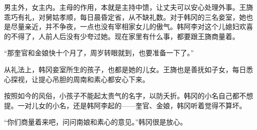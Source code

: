 男主外，女主内。主母的作用，本就是主持中馈，让丈夫可以安心处理外事。王旖乖巧有礼，对舅姑孝顺，每日晨昏定省，从不缺礼数。对于韩冈的三名妾室，她也是尽量亲近，并不争夜，一点也没有宰相家女儿的傲气。韩阿李对这个儿媳妇欢喜的不得了，人前人后没有少夸过她。现在家里有什么事，都要跟王旖商量着。

“那奎官和金娘快十个月了，周岁转眼就到，也要准备一下了。”

从礼法上，韩冈妾室所生的孩子，也都是她的儿女。王旖也是善抚如子女，每日悉心探视，让提心吊胆的周南和素心都安心下来。

按照如今的风俗，小孩子不能起太贵气的名字，以防夭折。韩冈的小名自己都不想提。一对儿女的小名，还是韩阿李起的——奎官、金娘，韩冈听着觉得不算坏。

“你们商量着来吧，问问南娘和素心的意见。”韩冈很是放心。

